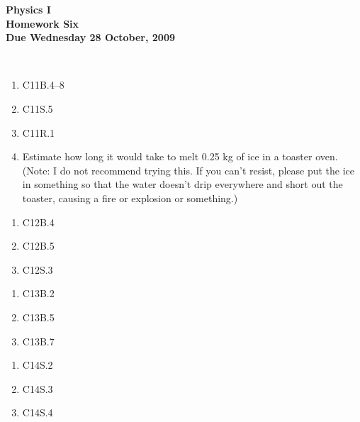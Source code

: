 \documentclass[12pt]{article}
\begin{document}
\pagestyle{empty}
 
\begin{center}
{\large {\bf Physics I}}\\
\medskip
{\large {\bf Homework Six}}\\
\medskip
{ {\bf Due Wednesday 28  October, 2009}}\\
\end{center}

\hspace{2mm}\\


\begin{enumerate}
\setlength{\itemsep}{-1mm}
  \item C11B.4--8
  \item C11S.5
  \item C11R.1
  \item Estimate how long it would take to melt 0.25 kg of ice in a
    toaster oven.  (Note:  I do not recommend trying this.  If you
    can't resist, please put the ice in something so that the water
    doesn't drip everywhere and short out the toaster, causing a fire
    or explosion or something.)
\end{enumerate}



\begin{enumerate}
\setlength{\itemsep}{-1mm}
  \item C12B.4
  \item C12B.5
  \item C12S.3
\end{enumerate}


\begin{enumerate}
\setlength{\itemsep}{-1mm}
  \item C13B.2
  \item C13B.5
  \item C13B.7
\end{enumerate}


\begin{enumerate}
\setlength{\itemsep}{-1mm}
  \item C14S.2
  \item C14S.3
  \item C14S.4
\end{enumerate}
\end{document}
